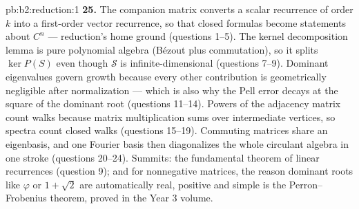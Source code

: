 \begin{solution}{pb:b2:reduction:1}
\textbf{25.} The companion matrix converts a scalar recurrence
of order $k$ into a first-order vector recurrence, so that
closed formulas become statements about $C^n$ --- reduction's
home ground (questions 1--5). The kernel decomposition lemma is
pure polynomial algebra (Bézout plus commutation), so it splits
$\ker P(S)$ even though $\mathcal{S}$ is infinite-dimensional
(questions 7--9). Dominant eigenvalues govern growth because
every other contribution is geometrically negligible after
normalization --- which is also why the Pell error decays at the
square of the dominant root (questions 11--14). Powers of the
adjacency matrix count walks because matrix multiplication sums
over intermediate vertices, so spectra count closed walks
(questions 15--19). Commuting matrices share an eigenbasis, and
one Fourier basis then diagonalizes the whole circulant algebra
in one stroke (questions 20--24). Summits: the fundamental
theorem of linear recurrences (question 9); and for nonnegative
matrices, the reason dominant roots like $\varphi$ or $1 +
\sqrt2$ are automatically real, positive and simple is the
Perron--Frobenius theorem, proved in the Year 3 volume.
\end{solution}
